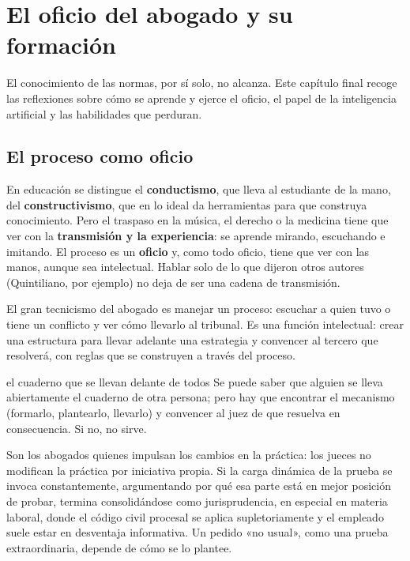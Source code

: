 \documentclass[12pt,oneside]{book}
\begin{document}
\chapter{El oficio del abogado y su formación}

El conocimiento de las normas, por sí solo, no alcanza. Este capítulo final recoge las reflexiones sobre cómo se aprende y ejerce el oficio, el papel de la inteligencia artificial y las habilidades que perduran.

\section{El proceso como oficio}

En educación se distingue el \textbf{conductismo}, que lleva al estudiante de la mano, del \textbf{constructivismo}, que en lo ideal da herramientas para que construya conocimiento. Pero el traspaso en la música, el derecho o la medicina tiene que ver con la \textbf{transmisión y la experiencia}: se aprende mirando, escuchando e imitando. El proceso es un \textbf{oficio} y, como todo oficio, tiene que ver con las manos, aunque sea intelectual. Hablar solo de lo que dijeron otros autores (Quintiliano, por ejemplo) no deja de ser una cadena de transmisión.

\begin{importante}
El gran tecnicismo del abogado es manejar un proceso: escuchar a quien tuvo o tiene un conflicto y ver cómo llevarlo al tribunal. Es una función intelectual: crear una estructura para llevar adelante una estrategia y convencer al tercero que resolverá, con reglas que se construyen a través del proceso.
\end{importante}

\begin{ejemplo}{el cuaderno que se llevan delante de todos}
Se puede saber que alguien se lleva abiertamente el cuaderno de otra persona; pero hay que encontrar el mecanismo (formarlo, plantearlo, llevarlo) y convencer al juez de que resuelva en consecuencia. Si no, no sirve.
\end{ejemplo}

Son los abogados quienes impulsan los cambios en la práctica: los jueces no modifican la práctica por iniciativa propia. Si la carga dinámica de la prueba se invoca constantemente, argumentando por qué esa parte está en mejor posición de probar, termina consolidándose como jurisprudencia, en especial en materia laboral, donde el código civil procesal se aplica supletoriamente y el empleado suele estar en desventaja informativa. Un pedido «no usual», como una prueba extraordinaria, depende de cómo se lo plantee.
\end{document}
